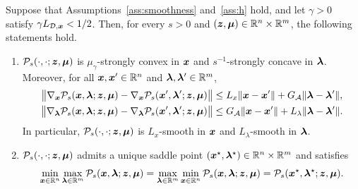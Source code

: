 \begin{proposition}
\label{prop:curvature-smoothness}
Suppose that Assumptions~\ref{ass:smoothness} and~\ref{ass:h} hold, and let
\(\gamma>0\) satisfy \(\gamma L_{\mathcal{D},\bm{x}}<1/2\). Then, for every \(s>0\) and
\((\bm{z},\bm{\mu})\in\mathbb{R}^n\times\mathbb{R}^m\), the following statements hold.
\begin{enumerate}[label=(\alph*)]
\item \(\mathcal P_s(\cdot,\cdot;\bm{z},\bm{\mu})\) is \(\mu_\gamma\)-strongly
convex in \(\bm{x}\) and \(s^{-1}\)-strongly concave in \(\bm{\lambda}\). Moreover, for
all \(\bm{x},\bm{x}'\in\mathbb{R}^n\) and \(\bm{\lambda},\bm{\lambda}'\in\mathbb{R}^m\),
\begin{align*}
    \bigl\|
    \nabla_{\bm{x}}\mathcal{P}_s(\bm{x},\bm{\lambda};\bm{z},\bm{\mu})
    -\nabla_{\bm{x}}\mathcal{P}_s(\bm{x}',\bm{\lambda}';\bm{z},\bm{\mu})
    \bigr\|
    &\le L_x\|\bm{x}-\bm{x}'\|+G_{\mathcal{A}}\|\bm{\lambda}-\bm{\lambda}'\|,\\
    \bigl\|
    \nabla_{\bm{\lambda}}\mathcal{P}_s(\bm{x},\bm{\lambda};\bm{z},\bm{\mu})
    -\nabla_{\bm{\lambda}}\mathcal{P}_s(\bm{x}',\bm{\lambda}';\bm{z},\bm{\mu})
    \bigr\|
    &\le G_{\mathcal{A}}\|\bm{x}-\bm{x}'\|+L_\lambda\|\bm{\lambda}-\bm{\lambda}'\|.
\end{align*}
In particular, \(\mathcal P_s(\cdot,\cdot;\bm{z},\bm{\mu})\) is \(L_x\)-smooth in
\(\bm{x}\) and \(L_\lambda\)-smooth in \(\bm{\lambda}\).
\item \(\mathcal P_s(\cdot,\cdot;\bm{z},\bm{\mu})\) admits a unique saddle point
\((\bm{x}^\star,\bm{\lambda}^\star)\in\mathbb{R}^n\times\mathbb{R}^m\) and satisfies
\[
    \min_{\bm{x}\in\mathbb{R}^n}\max_{\bm{\lambda}\in\mathbb{R}^m}\mathcal P_s(\bm{x},\bm{\lambda};\bm{z},\bm{\mu})
    =\max_{\bm{\lambda}\in\mathbb{R}^m}\min_{\bm{x}\in\mathbb{R}^n}\mathcal P_s(\bm{x},\bm{\lambda};\bm{z},\bm{\mu})
    =\mathcal P_s(\bm{x}^\star,\bm{\lambda}^\star;\bm{z},\bm{\mu}).
\]
\end{enumerate}
\end{proposition}

